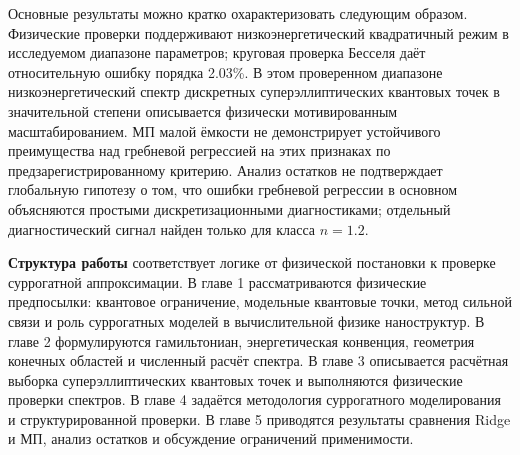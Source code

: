 Основные результаты можно кратко охарактеризовать следующим образом. Физические проверки
поддерживают низкоэнергетический квадратичный режим в исследуемом диапазоне параметров;
круговая проверка Бесселя даёт относительную ошибку порядка 2.03\%. В этом проверенном
диапазоне низкоэнергетический спектр дискретных суперэллиптических квантовых точек в
значительной степени описывается физически мотивированным масштабированием. МП малой
ёмкости не демонстрирует устойчивого преимущества над гребневой регрессией на этих
признаках по предзарегистрированному критерию. Анализ остатков не подтверждает глобальную
гипотезу о том, что ошибки гребневой регрессии в основном объясняются простыми
дискретизационными диагностиками; отдельный диагностический сигнал найден только для
класса $n=1.2$.

\textbf{Структура работы} соответствует логике от физической постановки к проверке
суррогатной аппроксимации. В главе 1 рассматриваются физические предпосылки: квантовое
ограничение, модельные квантовые точки, метод сильной связи и роль суррогатных моделей в
вычислительной физике наноструктур. В главе 2 формулируются гамильтониан, энергетическая
конвенция, геометрия конечных областей и численный расчёт спектра. В главе 3 описывается
расчётная выборка суперэллиптических квантовых точек и выполняются физические проверки
спектров. В главе 4 задаётся методология суррогатного моделирования и структурированной
проверки. В главе 5 приводятся результаты сравнения Ridge и МП, анализ остатков и
обсуждение ограничений применимости.

\clearpage
